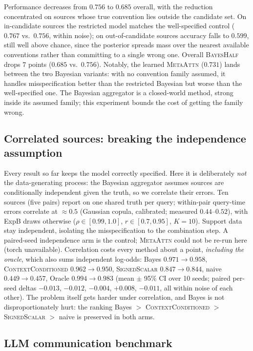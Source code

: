 Performance decreases from $0.756$ to $0.685$ overall, with the reduction
concentrated on sources whose true convention lies outside the candidate
set. On in-candidate sources the restricted model matches the
well-specified control ($0.767$ vs.\ $0.756$, within noise); on
out-of-candidate sources accuracy falls to $0.599$, still well above
chance, since the posterior spreads mass over the nearest available
conventions rather than committing to a single wrong one. Overall
\textsc{BayesHalf} drops $7$ points ($0.685$ vs.\ $0.756$).
Notably, the learned \textsc{MetaAttn} ($0.731$) lands between the two
Bayesian variants: with no convention family assumed, it handles
misspecification better than the restricted Bayesian but worse than the
well-specified one. The Bayesian aggregator is a closed-world method,
strong inside its assumed family; this experiment bounds the cost of
getting the family wrong.

\subsection{Correlated sources: breaking the independence assumption}

Every result so far keeps the model correctly specified. Here it is
deliberately \emph{not} the data-generating process: the Bayesian
aggregator assumes sources are conditionally independent given the truth,
so we correlate their errors. Ten sources (five pairs) report on one
shared truth per query; within-pair query-time errors correlate at
$\approx 0.5$ (Gaussian copula, calibrated; measured $0.44$--$0.52$),
with ExpB draws otherwise ($\rho \in [0.99, 1.0]$, $r \in [0.7, 0.95]$,
$K = 10$). Support data stay independent, isolating the misspecification
to the combination step. A paired-seed independence arm is the control;
\textsc{MetaAttn} could not be re-run here (torch unavailable). Correlation
costs every method about a point, \emph{including the oracle}, which also
sums independent log-odds: Bayes $0.971 \to 0.958$,
\textsc{ContextConditioned} $0.962 \to 0.950$,
\textsc{SignedScalar} $0.847 \to 0.844$, naive $0.449 \to 0.457$, Oracle
$0.994 \to 0.983$ (mean $\pm$ 95\% CI over 10 seeds; paired per-seed deltas
$-0.013$, $-0.012$, $-0.004$, $+0.008$, $-0.011$, all within noise of each
other). The problem itself gets harder under correlation, and Bayes is
not disproportionately hurt: the ranking Bayes ${} > {}$
\textsc{ContextConditioned} ${} > {}$ \textsc{SignedScalar} ${} > {}$
naive is preserved in both arms.

\subsection{LLM communication benchmark}

